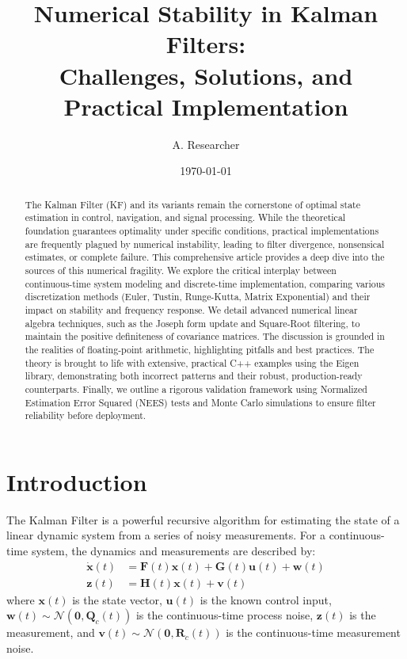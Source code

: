 \documentclass[11pt]{article}
\title{Numerical Stability in Kalman Filters:\\
Challenges, Solutions, and Practical Implementation}
\author{A. Researcher}
\date{\today}
\begin{document}
\maketitle

\begin{abstract}
The Kalman Filter (KF) and its variants remain the cornerstone of optimal state estimation in control, navigation, and signal processing. While the theoretical foundation guarantees optimality under specific conditions, practical implementations are frequently plagued by numerical instability, leading to filter divergence, nonsensical estimates, or complete failure. This comprehensive article provides a deep dive into the sources of this numerical fragility. We explore the critical interplay between continuous-time system modeling and discrete-time implementation, comparing various discretization methods (Euler, Tustin, Runge-Kutta, Matrix Exponential) and their impact on stability and frequency response. We detail advanced numerical linear algebra techniques, such as the Joseph form update and Square-Root filtering, to maintain the positive definiteness of covariance matrices. The discussion is grounded in the realities of floating-point arithmetic, highlighting pitfalls and best practices. The theory is brought to life with extensive, practical C++ examples using the Eigen library, demonstrating both incorrect patterns and their robust, production-ready counterparts. Finally, we outline a rigorous validation framework using Normalized Estimation Error Squared (NEES) tests and Monte Carlo simulations to ensure filter reliability before deployment.
\end{abstract}

\tableofcontents
\newpage

\section{Introduction}
\label{sec:intro}
The Kalman Filter is a powerful recursive algorithm for estimating the state of a linear dynamic system from a series of noisy measurements. For a continuous-time system, the dynamics and measurements are described by:
\begin{align}
\dot{\bm{x}}(t) &= \bm{F}(t) \bm{x}(t) + \bm{G}(t) \bm{u}(t) + \bm{w}(t) \label{eq:cont_sys}\\
\bm{z}(t) &= \bm{H}(t) \bm{x}(t) + \bm{v}(t) \label{eq:cont_meas}
\end{align}
where $\bm{x}(t)$ is the state vector, $\bm{u}(t)$ is the known control input, $\bm{w}(t) \sim \mathcal{N}(\bm{0}, \bm{Q}_c(t))$ is the continuous-time process noise, $\bm{z}(t)$ is the measurement, and $\bm{v}(t) \sim \mathcal{N}(\bm{0}, \bm{R}_c(t))$ is the continuous-time measurement noise.
\end{document}
